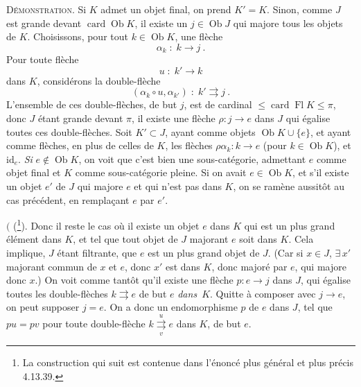 \documentclass[11pt]{article}
\newcommand{\msp}[1]{\marginpar{\footnotesize [#1]}}
\newcommand{\Ob}{\operatorname{Ob}}
\newcommand{\card}{\operatorname{card}}
\newcommand{\Fl}{\operatorname{Fl}}
\newcommand{\id}{\mathrm{id}}
\begin{document}
\textsc{Démonstration}. Si $K$ admet un objet final, on prend $K' = K$. Sinon, comme $J$ est grande devant $\card \Ob K$, il existe un $j \in \Ob J$ qui majore tous les objets de $K$. Choisissons, pour tout $k \in \Ob K$, une flèche
\[ \alpha_k \;:\; k \longrightarrow j \ . \]
Pour toute flèche
\[ u \;:\; k' \longrightarrow k \]
dans $K$, considérons la double-flèche
\[ (\alpha_k \circ u, \alpha_{k'}) \;:\; k' \rightrightarrows j \ . \]
L'ensemble de ces double-flèches, de but $j$, est de cardinal $\leqslant \card \Fl K \leqslant \pi$, donc $J$ étant grande devant $\pi$, il existe une flèche $\rho : j \longrightarrow e$ dans $J$ qui égalise toutes ces double-flèches. Soit $K' \subset J$, ayant comme objets $\Ob K \cup \{e\}$, et ayant comme flèches, en plus de
\msp{page 363}
celles de $K$, les flèches $\rho\alpha_k : k \longrightarrow e$ (pour $k \in \Ob K$), et $\id_e$. \textit{Si} $e \notin \Ob K$, on voit que c'est bien une sous-catégorie, admettant $e$ comme objet final et $K$ comme sous-catégorie pleine. Si on avait $e \in \Ob K$, et s'il existe un objet $e'$ de $J$ qui majore $e$ et qui n'est pas dans $K$, on se ramène aussitôt au cas précédent, en remplaçant $e$ par $e'$.

$\Biggl($ (\footnote[161]{La construction qui suit est contenue dans l'énoncé plus général et plus précis 4.13.39.}). Donc il reste le cas où il existe un objet $e$ dans $K$ qui est un plus grand élément dans $K$, et tel que tout objet de $J$ majorant $e$ soit dans $K$. Cela implique, $J$ étant filtrante, que $e$ est un plus grand objet de $J$. (Car si $x \in J$, $\exists\, x'$ majorant commun de $x$ et $e$, donc $x'$ est dans $K$, donc majoré par $e$, qui majore donc $x$.) On voit comme tantôt qu'il existe une flèche $p : e \longrightarrow j$ dans $J$, qui égalise toutes les double-flèches $k \rightrightarrows e$ de but $e$ \textit{dans}~$K$. Quitte à composer avec $j \longrightarrow e$, on peut supposer $j = e$. On a donc un endomorphisme $p$ de $e$ dans $J$, tel que $pu = pv$ pour toute double-flèche $k \overset{u}{\underset{v}{\rightrightarrows}} e$ dans $K$, de but $e$.

\msp{page 364}
\end{document}
